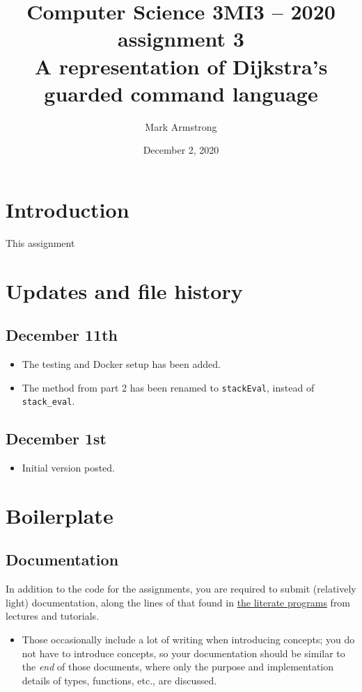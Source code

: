 \documentclass[11pt]{article}
\author{Mark Armstrong}
\date{December 2, 2020}
\title{Computer Science 3MI3 – 2020 assignment 3\\\medskip
\large A representation of Dijkstra's guarded command language}
\theoremstyle{definition}
\begin{document}
\maketitle
\tableofcontents


\section*{Introduction}
\label{sec:orgec7337d}
This assignment 

\section*{Updates and file history}
\label{sec:orgd7db204}
\subsection*{December 11th}
\label{sec:orgce70cf5}
\begin{itemize}
\item The testing and Docker setup has been added.
\item The method from part 2 has been renamed to \texttt{stackEval},
instead of \texttt{stack\_eval}.
\end{itemize}

\subsection*{December 1st}
\label{sec:org8644b83}
\begin{itemize}
\item Initial version posted.
\end{itemize}

\section*{Boilerplate}
\label{sec:orge9dedd0}
\subsection*{Documentation}
\label{sec:org2f2edee}
In addition to the code for the assignments,
you are required to submit (relatively light) documentation,
along the lines of that found in
\href{https://armkeh.github.io/principles-of-programming-languages/\#outline-container-Lecture-literate-programs}{the literate programs}
from lectures and tutorials.
\begin{itemize}
\item Those occasionally include a lot of writing when introducing concepts;
you do not have to introduce concepts, so your documentation
should be similar to the \emph{end} of those documents,
where only the purpose and implementation details
of types, functions, etc., are discussed.
\end{itemize}
\end{document}
